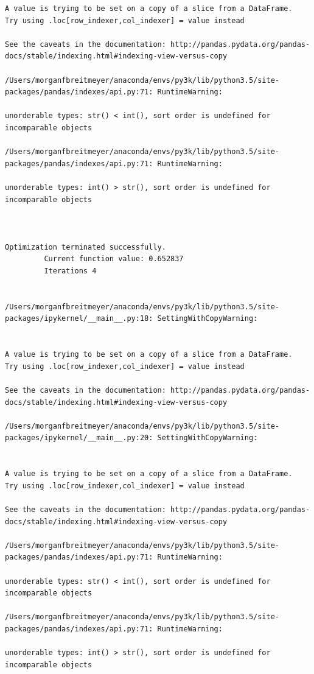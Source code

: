 \begin{lstlisting}
A value is trying to be set on a copy of a slice from a DataFrame.
Try using .loc[row_indexer,col_indexer] = value instead

See the caveats in the documentation: http://pandas.pydata.org/pandas-docs/stable/indexing.html#indexing-view-versus-copy

/Users/morganfbreitmeyer/anaconda/envs/py3k/lib/python3.5/site-packages/pandas/indexes/api.py:71: RuntimeWarning:

unorderable types: str() < int(), sort order is undefined for incomparable objects

/Users/morganfbreitmeyer/anaconda/envs/py3k/lib/python3.5/site-packages/pandas/indexes/api.py:71: RuntimeWarning:

unorderable types: int() > str(), sort order is undefined for incomparable objects



Optimization terminated successfully.
         Current function value: 0.652837
         Iterations 4


/Users/morganfbreitmeyer/anaconda/envs/py3k/lib/python3.5/site-packages/ipykernel/__main__.py:18: SettingWithCopyWarning:


A value is trying to be set on a copy of a slice from a DataFrame.
Try using .loc[row_indexer,col_indexer] = value instead

See the caveats in the documentation: http://pandas.pydata.org/pandas-docs/stable/indexing.html#indexing-view-versus-copy

/Users/morganfbreitmeyer/anaconda/envs/py3k/lib/python3.5/site-packages/ipykernel/__main__.py:20: SettingWithCopyWarning:


A value is trying to be set on a copy of a slice from a DataFrame.
Try using .loc[row_indexer,col_indexer] = value instead

See the caveats in the documentation: http://pandas.pydata.org/pandas-docs/stable/indexing.html#indexing-view-versus-copy

/Users/morganfbreitmeyer/anaconda/envs/py3k/lib/python3.5/site-packages/pandas/indexes/api.py:71: RuntimeWarning:

unorderable types: str() < int(), sort order is undefined for incomparable objects

/Users/morganfbreitmeyer/anaconda/envs/py3k/lib/python3.5/site-packages/pandas/indexes/api.py:71: RuntimeWarning:

unorderable types: int() > str(), sort order is undefined for incomparable objects




\end{lstlisting}
